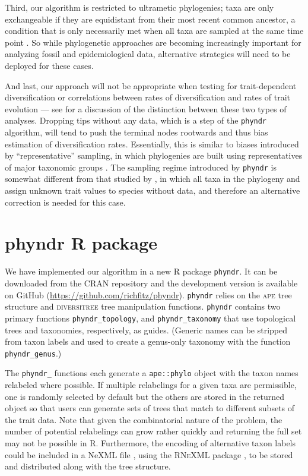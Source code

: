 \documentclass[a4paper,11pt]{article}
\newcommand{\phyndr}{\tt phyndr}
\begin{document}
Third, our algorithm is restricted to ultrametic phylogenies; taxa are only exchangeable if they are equidistant from their most recent common ancestor, a condition that is only necessarily met when all taxa are sampled at the same time point \citep[see][for more discussion of this point and its implications for models of trait evolution]{SlaterMEE}. So while phylogenetic approaches are becoming increasingly important for analyzing fossil and epidemiological data, alternative strategies will need to be deployed for these cases.

And last, our approach will not be appropriate when testing for trait-dependent diversification \citep[e.g.,][]{Maddison2007, FitzJohn2012} or correlations between rates of diversification and rates of trait evolution \citep[e.g.,][]{Rabosky2013, Rabosky2014} --- see \citealt{PennellPE} for a discussion of the distinction between these two types of analyses. Dropping tips without any data, which is a step of the {\phyndr} algorithm, will tend to push the terminal nodes rootwards and thus bias estimation of diversification rates. Essentially, this is similar to biases introduced by ``representative'' sampling, in which phylogenies are built using representatives of major taxonomic groups \citep{Hohna2011, Stadler2013}. The sampling regime introduced by {\phyndr} is somewhat different from that studied by \citet{FitzJohn2009}, in which all taxa in the phylogeny and assign unknown trait values to species without data, and therefore an alternative correction is needed for this case.  

\section{phyndr R package}

We have implemented our algorithm in a new R package {\phyndr}. It can be downloaded from the CRAN repository and the development version is available on GitHub (\url{https://github.com/richfitz/phyndr}). {\phyndr} relies on the \textsc{ape} \citep{ape} tree structure and \textsc{diversitree} \citep{FitzJohn2012} tree manipulation functions. {\phyndr} contains two primary functions \texttt{phyndr\_topology}, and \texttt{phyndr\_taxonomy} that use topological trees and taxonomies, respectively, as guides. (Generic names can be stripped from taxon labels and used to create a genus-only taxonomy with the function \texttt{phyndr\_genus}.) 

The \texttt{phyndr\_} functions each generate a \texttt{ape::phylo} object with the taxon names relabeled where possible. If multiple relabelings for a given taxa are permissible, one is randomly selected by default but the others are stored in the returned object so that users can generate sets of trees that match to different subsets of the trait data. Note that given the combinatorial nature of the problem, the number of potential relabelings can grow rather quickly and returning the full set may not be possible in R. Furthermore, the encoding of alternative taxon labels could be included in a NeXML file \citep{nexml}, using the \textsc{RNeXML} package \citep{rnexml}, to be stored and distributed along with the tree structure.
\end{document}
